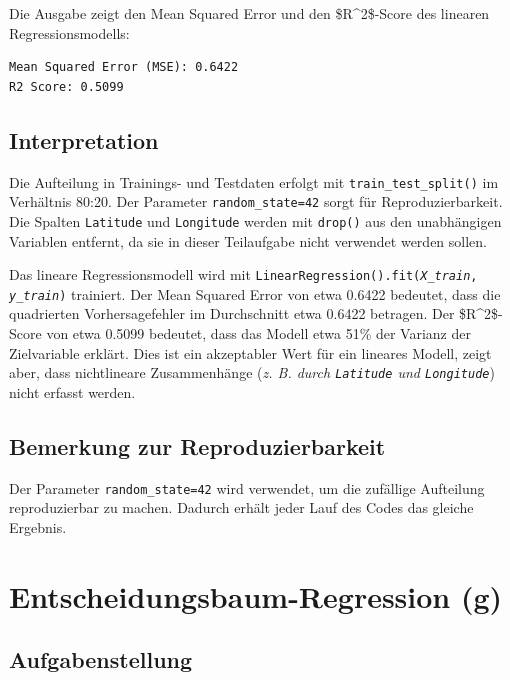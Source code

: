 Die Ausgabe zeigt den Mean Squared Error und den \acs{$R^2$-Score} des linearen Regressionsmodells:

\begin{verbatim}
Mean Squared Error (MSE): 0.6422
R2 Score: 0.5099
\end{verbatim}

\subsection{Interpretation}

Die Aufteilung in Trainings- und Testdaten erfolgt mit \texttt{train\_test\_split()} im Verhältnis 80:20. Der Parameter \texttt{random\_state=42} sorgt für Reproduzierbarkeit. Die Spalten \texttt{Latitude} und \texttt{Longitude} werden mit \texttt{drop()} aus den unabhängigen Variablen entfernt, da sie in dieser Teilaufgabe nicht verwendet werden sollen.

Das lineare Regressionsmodell wird mit \texttt{LinearRegression().fit(\textit{X\_train}, \textit{y\_train})} trainiert. Der Mean Squared Error von etwa 0.6422 bedeutet, dass die quadrierten Vorhersagefehler im Durchschnitt etwa 0.6422 betragen. Der \acs{$R^2$-Score} von etwa 0.5099 bedeutet, dass das Modell etwa 51\% der Varianz der Zielvariable erklärt. Dies ist ein akzeptabler Wert für ein lineares Modell, zeigt aber, dass nichtlineare Zusammenhänge (\textit{\acs{z. B.} durch \texttt{Latitude} und \texttt{Longitude}}) nicht erfasst werden.

\subsection{Bemerkung zur Reproduzierbarkeit}

Der Parameter \texttt{random\_state=42} wird verwendet, um die zufällige Aufteilung reproduzierbar zu machen. Dadurch erhält jeder Lauf des Codes das gleiche Ergebnis.

\cleardoublepage


\section{Entscheidungsbaum-Regression (g)}
\label{sec:2g}

\subsection{Aufgabenstellung}


